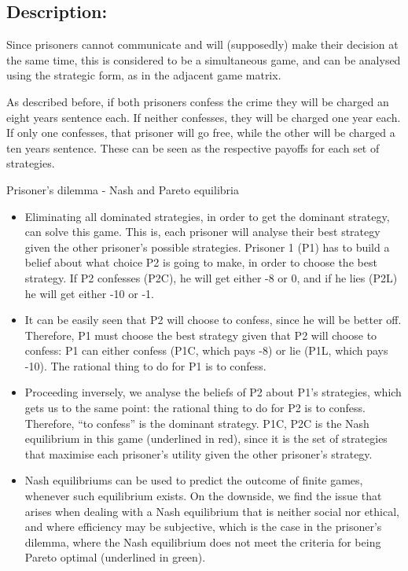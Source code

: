 \documentclass[]{report}
\begin{document}
\subsection{Description:}

Since prisoners cannot communicate and will (supposedly) make their decision at the same time, this is considered to be a simultaneous game, and can be analysed using the strategic form, as in the adjacent game matrix. 

As described before, if both prisoners confess the crime they will be charged an eight years sentence each. If neither confesses, they will be charged one year each. If only one confesses, that prisoner will go free, while the other will be charged a ten years sentence. These can be seen as the respective payoffs for each set of strategies.

Prisoner's dilemma - Nash and Pareto equilibria
\begin{itemize}
\item Eliminating all dominated strategies, in order to get the dominant strategy, can solve this game. This is, each prisoner will analyse their best strategy given the other prisoner’s possible strategies. Prisoner 1 (P1) has to build a belief about what choice P2 is going to make, in order to choose the best strategy. If P2 confesses (P2C), he will get either -8 or 0, and if he lies (P2L) he will get either -10 or -1. 
	
\item It can be easily seen that P2 will choose to confess, since he will be better off. Therefore, P1 must choose the best strategy given that P2 will choose to confess: P1 can either confess (P1C, which pays -8) or lie (P1L, which pays -10). The rational thing to do for P1 is to confess. 
	
\item	Proceeding inversely, we analyse the beliefs of P2 about P1’s strategies, which gets us to the same point: the rational thing to do for P2 is to confess. Therefore, “to confess” is the dominant strategy. P1C, P2C is the Nash equilibrium in this game (underlined in red), since it is the set of strategies that maximise each prisoner’s utility given the other prisoner’s strategy.
	
\item Nash equilibriums can be used to predict the outcome of finite games, whenever such equilibrium exists. On the downside, we find the issue that arises when dealing with a Nash equilibrium that is neither social nor ethical, and where efficiency may be subjective, which is the case in the prisoner’s dilemma, where the Nash equilibrium does not meet the criteria for being Pareto optimal (underlined in green).
	
\end{itemize}
\end{document}
